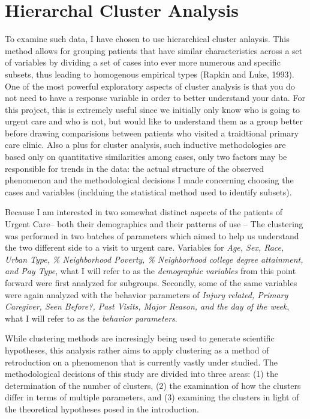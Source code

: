 \documentclass[12pt,twoside]{reedthesis}
\begin{document}
  \section{Hierarchal Cluster Analysis}\label{hierarchal-cluster-analysis}
  
  To examine such data, I have chosen to use hierarchical cluster
  anlaysis. This method allows for grouping patients that have similar
  characteristics across a set of variables by dividing a set of cases
  into ever more numerous and specific subsets, thus leading to homogenous
  empirical types (Rapkin and Luke, 1993). One of the most powerful
  exploratory aspects of cluster analysis is that you do not need to have
  a response variable in order to better understand your data. For this
  project, this is extremely useful since we initially only know who is
  going to urgent care and who is not, but would like to understand them
  as a group better before drawing comparisions between patients who
  visited a traidtional primary care clinic. Also a plus for cluster
  analysis, such inductive methodologies are based only on quantitative
  similarities among cases, only two factors may be responsible for trends
  in the data: the actual structure of the observed phenomenon and the
  methodological decisions I made concerning choosing the cases and
  variables (inclduing the statistical method used to identify subsets).
  
  Because I am interested in two somewhat distinct aspects of the patients
  of Urgent Care-- both their demographics and their patterns of use --
  The clustering was performed in two batches of parameters which aimed to
  help us understand the two different side to a visit to urgent care.
  Variables for \emph{Age, Sex, Race, Urban Type, \% Neighborhood Poverty,
  \% Neighborhood college degree attainment, and Pay Type}, what I will
  refer to as the \emph{demographic variables} from this point forward
  were first analyzed for subgroups. Secondly, some of the same variables
  were again analyzed with the behavior parameters of \emph{Injury
  related, Primary Caregiver, Seen Before?, Past Visits, Major Reason, and
  the day of the week}, what I will refer to as the \emph{behavior
  parameters}.
  
  While clustering methods are incresingly being used to generate
  scientific hypotheses, this analysis rather aims to apply clustering as
  a method of retroduction on a phenomenon that is currently vastly under
  studied. The methodological decisions of this study are divided into
  three areas: (1) the determination of the number of clusters, (2) the
  examination of how the clusters differ in terms of multiple parameters,
  and (3) examining the clusters in light of the theoretical hypotheses
  posed in the introduction.
  
\end{document}
